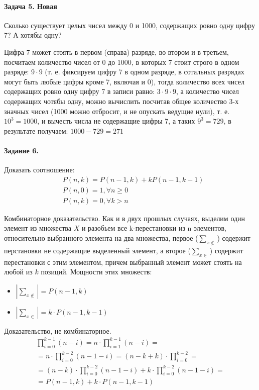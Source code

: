 \documentclass[a4paper,12pt]{article}
\begin{document}
\paragraph{Задача 5. Новая} Сколько существует целых чисел между 0 и 1000, содержащих ровно одну цифру 7? А хотябы одну?
\begin{Solution}
Цифра 7 может стоять в первом (справа) разряде, во втором и в третьем, посчитаем количество чисел от 0 до 1000, в которых 7 стоит строго в одном разряде: $9 \cdot 9$ (т. е. фиксируем цифру 7 в одном разряде, в сотальных разрядах могут быть любые цифры кроме 7, включая и 0), тогда количество всех чисел содержащих ровно одну цифру 7 в записи равно: $3 \cdot 9 \cdot 9$, а количество чисел содержащих чотябы одну, можно вычислить посчитав общее количество 3-х значных чисел (1000 можно отбросит, и не опускать ведущие нули), т. е. $10^3 = 1000$, и вычесть числа не содержащие цифры 7, а таких $9^3 = 729$, в результате получаем: $1000 - 729 = 271$
\end{Solution}

\paragraph{Задание 6.} Доказать соотношение:
\[
	\begin{split}
		& P\left(n,k\right) = P\left(n-1,k\right)+k P\left(n-1,k-1\right)\\
		& P\left(n,0\right) = 1, \forall n \ge 0 \\
		& P\left(n,k\right) = 0, \forall k > n
	\end{split}
\]
\begin{Solution}
Комбинаторное доказательство. Как и в двух прошлых случаях, выделим один элемент из множества $X$ и разобьем все k-перестановки из n элементов, относительно выбранного элемента на два множества, первое ($\sum_{x \notin}$) содержит перстановки не содержащие выделенный элемент, а второе ($\sum_{x \in}$) содержит перестановки с этим элементом, причем выбранный элемент может стоять на любой из $k$ позиций. Мощности этих множеств:
\begin{itemize}
	\item $\left|\sum_{x \not\in}\right| = P\left(n-1,k\right)$

	\item $\left|\sum_{x \in}\right| = k \cdot P\left(n-1, k-1\right)$
\end{itemize}
\end{Solution}

\begin{Solution}
Доказательство, не комбинаторное.
\begin{multline*}
	\prod_{i=0}^{k-1}\left(n-i\right) = n \cdot \prod_{i=1}^{k-1} \left(n-i\right) = \\
	= n \cdot \prod_{i=0}^{k-2} \left(n-1-i\right) = \left(n-k+k\right) \cdot \prod_{i=0}^{k-2} = \\ 
	= \left(n-k\right) \cdot \prod_{i=0}^{k-2} \left(n-1-i\right)+k \cdot \prod_{i=0}^{k-2} \left(n-1-i\right) = \\ 
	= P\left(n-1,k\right) + k \cdot P \left(n-1, k-1\right)
\end{multline*}
\end{Solution}
\end{document}
